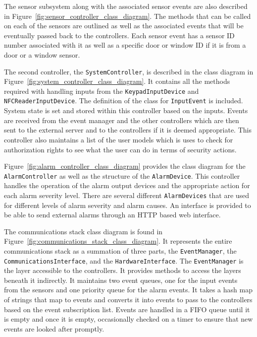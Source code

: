 \documentclass{report}
\begin{document}
The sensor subsystem along with the associated sensor events are also described
in Figure~\ref{fig:sensor_controller_class_diagram}. The methods that can be
called on each of the sensors are outlined as well as the associated events that
will be eventually passed back to the controllers. Each sensor event has a
sensor ID number associated with it as well as a specific door or window ID
if it is from a door or a window sensor.

The second controller, the \texttt{SystemController}, is described in the class
diagram in Figure~\ref{fig:system_controller_class_diagram}. It contains all
the methods required with handling inputs from the \texttt{KeypadInputDevice}
and \texttt{NFCReaderInputDevice}. The definition of the class for
\texttt{InputEvent} is included. System state is set and stored within this
controller based on the inputs. Events are received from the event manager and
the other controllers which are then sent to the external server and to the
controllers if it is deemed appropriate. This controller also maintains a list
of the user models which is uses to check for authorization rights to see what
the user can do in terms of security actions.

Figure~\ref{fig:alarm_controller_class_diagram} provides the class diagram for
the \texttt{AlarmController} as well as the structure of the
\texttt{AlarmDevice}. This controller handles the operation of the alarm output
devices and the appropriate action for each alarm severity level. There are
several different \texttt{AlarmDevices} that are used for different levels of
alarm severity and alarm causes. An interface is provided to be able to send
external alarms through an HTTP based web interface.

The communications stack class diagram is found in
Figure~\ref{fig:communications_stack_class_diagram}. It represents the entire
communications stack as a summation of three parts, the \texttt{EventManager},
the \texttt{CommunicationsInterface}, and the \texttt{HardwareInterface}. The
\texttt{EventManager} is the layer accessible to the controllers. It provides
methods to access the layers beneath it indirectly. It maintains two event
queues, one for the input events from the sensors and one priority queue for
the alarm events. It takes a hash map of strings that map to events and
converts it into events to pass to the controllers based on the event
subscription list. Events are handled in a FIFO queue until it is empty and
once it is empty, occasionally checked on a timer to ensure that new events are
looked after promptly.
\end{document}
